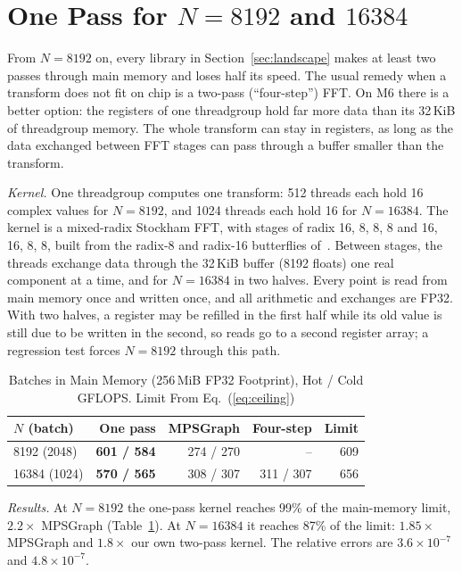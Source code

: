 \documentclass[conference]{IEEEtran}
\begin{document}
\section{One Pass for $N=8192$ and $16384$}\label{sec:onepass}

From $N=8192$ on, every library in Section~\ref{sec:landscape} makes at least two passes through main
memory and loses half its speed. The usual remedy when a transform does not fit on chip is a two-pass
(``four-step'') FFT. On M6 there is a better option: the registers of one threadgroup hold far more
data than its 32\,KiB of threadgroup memory. The whole transform can stay in registers, as long as the
data exchanged between FFT stages can pass through a buffer smaller than the transform.

\textit{Kernel.} One threadgroup computes one transform: 512 threads each hold 16 complex values for
$N=8192$, and 1024 threads each hold 16 for $N=16384$. The kernel is a mixed-radix Stockham FFT, with
stages of radix 16, 8, 8, 8 and 16, 16, 8, 8, built from the radix-8 and radix-16 butterflies
of~\cite{bergach2026fft}. Between stages, the threads exchange data through the 32\,KiB buffer (8192
floats) one real component at a time, and for $N=16384$ in two halves. Every point is read from main
memory once and written once, and all arithmetic and exchanges are FP32. With two halves, a register
may be refilled in the first half while its old value is still due to be written in the second, so reads
go to a second register array; a regression test forces $N=8192$ through this path.

\begin{table}[t]
\centering
\caption{Batches in Main Memory (256\,MiB FP32 Footprint), Hot / Cold GFLOPS. Limit From
Eq.~(\ref{eq:ceiling})}
\label{tab:onepass}
\footnotesize
\setlength{\tabcolsep}{4pt}
\begin{tabular}{@{}lrrrr@{}}
\toprule
\textbf{$N$ (batch)} & \textbf{One pass} & \textbf{MPSGraph} & \textbf{Four-step} & \textbf{Limit} \\
\midrule
8192 (2048) & \textbf{601 / 584} & 274 / 270 & -- & 609 \\
16384 (1024) & \textbf{570 / 565} & 308 / 307 & 311 / 307 & 656 \\
\bottomrule
\end{tabular}
\end{table}

\textit{Results.} At $N=8192$ the one-pass kernel reaches 99\% of the main-memory limit, $2.2\times$
MPSGraph (Table~\ref{tab:onepass}). At $N=16384$ it reaches 87\% of the limit: $1.85\times$ MPSGraph
and $1.8\times$ our own two-pass kernel. The relative errors are $3.6\times10^{-7}$ and
$4.8\times10^{-7}$.
\end{document}
